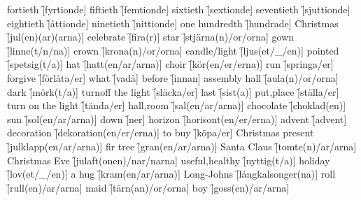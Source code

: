 \begin{questions}
\begin{multicols}{2}
        \question fortieth \f[fyrtionde]
        \question fiftieth \f[femtionde]
        \question sixtieth \f[sextionde]
        \question seventieth \f[sjuttionde]
        \question eightieth \f[åttionde]
        \question ninetieth \f[nittionde]
        \question one hundredth \f[hundrade]
        \question Christmas \f[jul(en)(ar)(arna)]
        \question celebrate \f[fira(r)]
        \question star \f[stjärna(n)/or/orna]
        \question gown \f[linne(t/n/na)]
        \question crown \f[krona(n)/or/orna]
        \question candle/light \f[ljus(et/\_/en)]
        \question pointed \f[spetsig(t/a)]
        \question hat \f[hatt(en/ar/arna)]
        \question choir \f[kör(en/er/erna)]
        \question run \f[springa/er]
        \question forgive \f[förlåta/er]
        \question what \f[vadå]
        \question before \f[innan]
        \question assembly hall \f[aula(n)/or/orna]
        \question dark \f[mörk(t/a)]
        \question turnoff the light \f[släcka/er]
        \question last \f[sist(a)]
        \question put,place \f[ställa/er]
        \question turn on the light \f[tända/er]
        \question hall,room \f[sal(en/ar/arna)]
        \question chocolate \f[choklad(en)]
        \question sun \f[sol(en/ar/arna)]
        \question down \f[ner]
        \question horizon \f[horisont(en/er/erna)]
        \question advent \f[advent]
        \question decoration \f[dekoration(en/er/erna)]
        \question to buy \f[köpa/er]
        \question Christmas present \f[julklapp(en/ar/arna)]
        \question fir tree \f[gran(en/ar/arna)]
        \question Santa Claus \f[tomte(n)/ar/arna]
        \question Christmas Eve \f[julaft(onen)/nar/narna]
        \question useful,healthy \f[nyttig(t/a)]
        \question holiday \f[lov(et/\_/en)]
        \question a hug \f[kram(en/ar/arna)]
        \question Long-Johns \f[långkalsonger(na)]
        \question roll \f[rull(en)/ar/arna]
        \question maid \f[tärn(an)/or/orna]
        \question boy \f[goss(en)/ar/arna]
    \end{multicols}
\end{questions}
